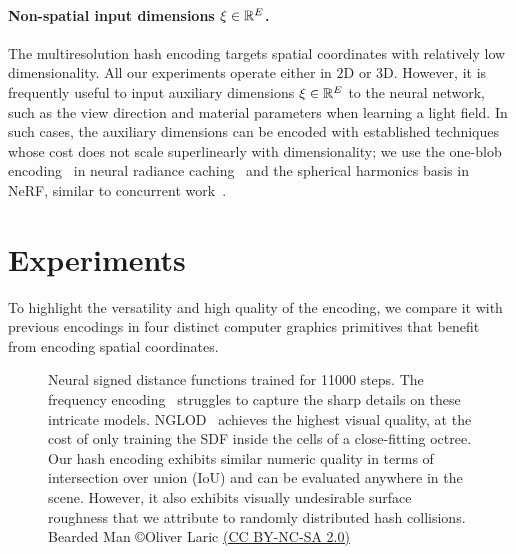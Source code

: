 \documentclass[acmtog,authorversion]{acmart}
\begin{document}
\paragraph{Non-spatial input dimensions ${\mathbf{\xi} \in \mathbb{R}^E}$.}
The multiresolution hash encoding targets spatial coordinates with relatively low dimensionality.
All our experiments operate either in $2$D or $3$D.
However, it is frequently useful to input auxiliary dimensions ${\mathbf{\xi} \in \mathbb{R}^E}$ to the neural network, such as the view direction and material parameters when learning a light field.
In such cases, the auxiliary dimensions can be encoded with established techniques whose cost does not scale superlinearly with dimensionality; we use the one-blob encoding~\cite{mueller2019nis} in neural radiance caching~\citep{mueller2021realtime} and the spherical harmonics basis in NeRF, similar to concurrent work~\cite{verbin2021refnerf,yu2021plenoxels}.



\section{Experiments}%
\label{Sec:Experiments}

To highlight the versatility and high quality of the encoding, we compare it with previous encodings in four distinct computer graphics primitives that benefit from encoding spatial coordinates.

\begin{figure}
  \small\sffamily
  \vspace{-3mm}
  
  \vspace{-3mm}
  \caption{\label{fig:sdf_results}%
    Neural signed distance functions trained for \num{11000} steps.
    The frequency encoding~\cite{mildenhall2020nerf} struggles to capture the sharp details on these intricate models.
    NGLOD~\cite{takikawa2021nglod} achieves the highest visual quality, at the cost of only training the SDF inside the cells of a close-fitting octree.
    Our hash encoding exhibits similar numeric quality in terms of intersection over union (IoU) and can be evaluated anywhere in the scene.
    However, it also exhibits visually undesirable surface roughness that we attribute to randomly distributed hash collisions. Bearded Man \copyright Oliver Laric \href{https://creativecommons.org/licenses/by-nc-sa/2.0/}{(CC BY-NC-SA 2.0)}
  }
\end{figure}
\end{document}
